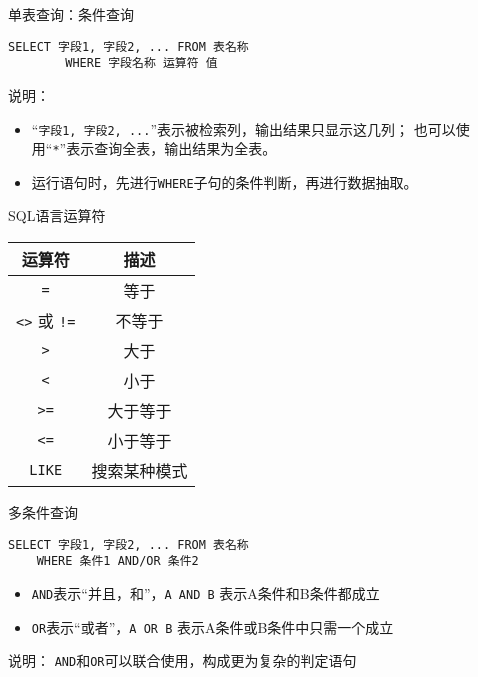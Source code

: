 \documentclass[t]{beamer}
\begin{document}
\begin{frame}[fragile]{单表查询：条件查询}
\begin{lstlisting}
SELECT 字段1, 字段2, ... FROM 表名称 
        WHERE 字段名称 运算符 值
\end{lstlisting}

\begin{block}{说明：}
\begin{itemize}
  \item   “\verb|字段1, 字段2, ...|”表示被检索列，输出结果只显示这几列；
也可以使用“\verb|*|”表示查询全表，输出结果为全表。
\item 运行语句时，先进行\verb|WHERE|子句的条件判断，再进行数据抽取。
\end{itemize}
\end{block}

\end{frame}

\begin{frame}[fragile]{SQL语言运算符}
\begin{center}
  \begin{tabular}{cc}
    \hline
    运算符&描述\\
    \hline
    \verb|=|& 等于\\
    \verb|<>| 或 \verb|!=|& 不等于\\
    \verb|>|& 大于\\
    \verb|<| &小于\\
    \verb|>=| &大于等于\\
    \verb|<=|& 小于等于\\
    \verb|LIKE|& 搜索某种模式\\
    \hline
  \end{tabular}
\end{center}
\end{frame}

\begin{frame}[fragile]{多条件查询}
\begin{lstlisting}
SELECT 字段1, 字段2, ... FROM 表名称
    WHERE 条件1 AND/OR 条件2
\end{lstlisting}
\begin{itemize}
  \item \verb|AND|表示“并且，和”，\verb|A AND B| 表示A条件和B条件都成立
  \item \verb|OR|表示“或者”，\verb|A OR B| 表示A条件或B条件中只需一个成立
\end{itemize}
\begin{block}{说明：}
  \verb|AND|和\verb|OR|可以联合使用，构成更为复杂的判定语句
\end{block}
\end{frame}
\end{document}
